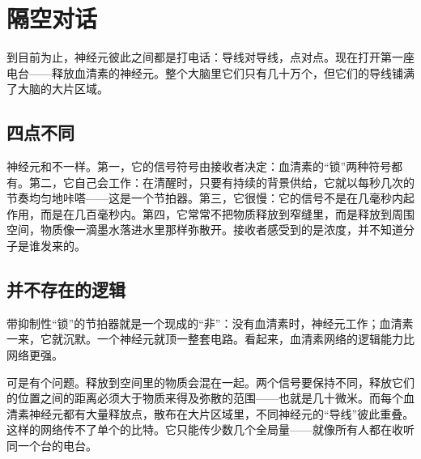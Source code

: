 \chapter{隔空对话}


到目前为止，神经元彼此之间都是打电话：导线对导线，点对点。现在打开第一座电台——释放血清素的神经元。整个大脑里它们只有几十万个，但它们的导线铺满了大脑的大片区域。

\section*{四点不同}

神经元和不一样。第一，它的信号符号由接收者决定：血清素的“锁”两种符号都有。第二，它自己会工作：在清醒时，只要有持续的背景供给，它就以每秒几次的节奏均匀地咔嗒——这是一个节拍器。第三，它很慢：它的信号不是在几毫秒内起作用，而是在几百毫秒内。第四，它常常不把物质释放到窄缝里，而是释放到周围空间，物质像一滴墨水落进水里那样弥散开。接收者感受到的是浓度，并不知道分子是谁发来的。

\section*{并不存在的逻辑}

带抑制性“锁”的节拍器就是一个现成的“非”：没有血清素时，神经元工作；血清素一来，它就沉默。一个神经元就顶一整套电路。看起来，血清素网络的逻辑能力比网络更强。

可是有个问题。释放到空间里的物质会混在一起。两个信号要保持不同，释放它们的位置之间的距离必须大于物质来得及弥散的范围——也就是几十微米。而每个血清素神经元都有大量释放点，散布在大片区域里，不同神经元的“导线”彼此重叠。这样的网络传不了单个的比特。它只能传少数几个全局量——就像所有人都在收听同一个台的电台。


